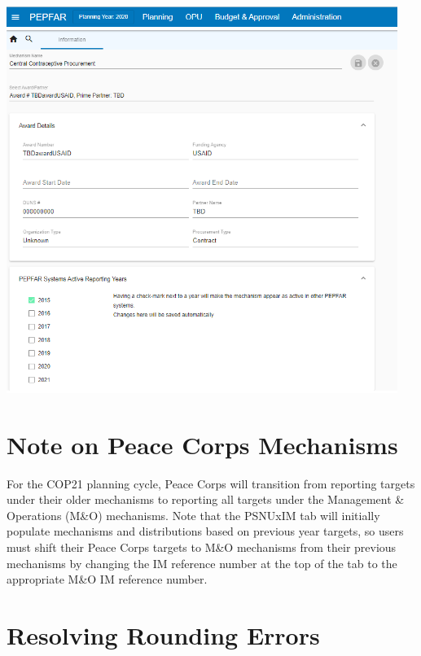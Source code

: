 \documentclass[
  openany]{book}
\begin{document}
\begin{center}

\includegraphics[width=5in]{./images/image15.png}

\end{center}

\hypertarget{note-on-peace-corps-mechanisms}{%
\section{Note on Peace Corps Mechanisms}\label{note-on-peace-corps-mechanisms}}

For the COP21 planning cycle, Peace Corps will transition from reporting
targets under their older mechanisms to reporting all targets under the
Management \& Operations (M\&O) mechanisms. Note that the PSNUxIM tab will
initially populate mechanisms and distributions based on previous year
targets, so users must shift their Peace Corps targets to M\&O mechanisms
from their previous mechanisms by changing the IM reference number at
the top of the tab to the appropriate M\&O IM reference number.

\hypertarget{resolving-rounding-errors}{%
\section{Resolving Rounding Errors}\label{resolving-rounding-errors}}
\end{document}
